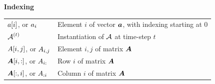 \documentclass[a4paper,twoside,openright]{book}
\theoremstyle{plain}
\theoremstyle{definition}
\begin{document}
\centerline{\bf Indexing}
\nopagebreak
\begin{tabular}{p{3cm}p{10cm}}
	$\displaystyle {a}[i]$, or $\displaystyle {a}_{i}$ & Element $i$ of vector ${\bm{a}}$, with indexing starting at 0\\
	$\displaystyle {\mathcal{A}}^{(t)}$ & Instantiation of ${\mathcal{A}}$ at time-step $t$\\
	$\displaystyle {A}[i,j]$, or $\displaystyle {A}_{i,j}$ & Element $i, j$ of matrix ${\bm{A}}$ \\
	$\displaystyle {\bm{A}}[i, :]$, or $\displaystyle {A}_{i:}$ & Row $i$ of matrix ${\bm{A}}$ \\
	$\displaystyle {\bm{A}}[:, i]$, or $\displaystyle {A}_{:i}$ & Column $i$ of matrix ${\bm{A}}$ \\
\end{tabular}
\vspace{0.5cm}


\end{document}
